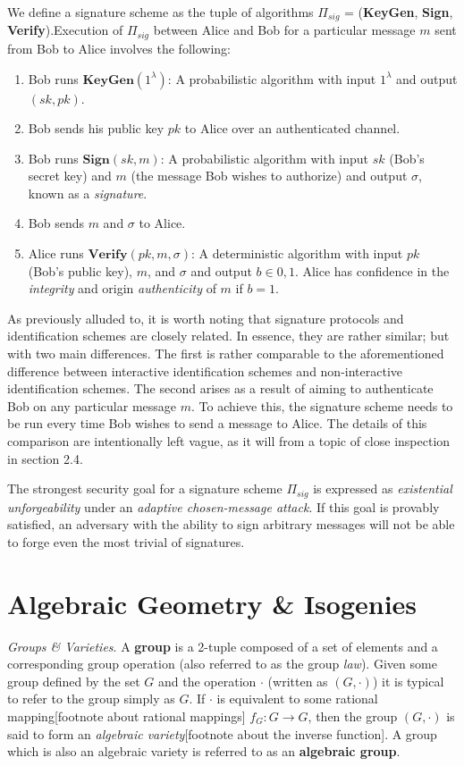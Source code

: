 We define a signature scheme as the tuple of algorithms $\Pi_{sig}$ = (\textbf{KeyGen}, \textbf{Sign}, \textbf{Verify}).Execution of $\Pi_{sig}$ between Alice and Bob for a particular message $m$ sent from Bob to Alice involves the following:
\begin{enumerate}[label=(\roman*)]
\item Bob runs $\textbf{KeyGen}(1^\lambda)$: A probabilistic algorithm with input $1^\lambda$ and output $(sk,pk)$.
\item Bob sends his public key $pk$ to Alice over an authenticated channel.
\item Bob runs $\textbf{Sign}(sk, m)$: A probabilistic algorithm with input $sk$ (Bob's secret key) and $m$ (the message Bob wishes to authorize) and output $\sigma$, known as a \emph{signature}.
\item Bob sends $m$ and $\sigma$ to Alice.
\item Alice runs $\textbf{Verify}(pk, m, \sigma)$: A deterministic algorithm with input $pk$ (Bob's public key), $m$, and $\sigma$ and output $b \in {0,1}$. Alice has confidence in the \emph{integrity} and origin \emph{authenticity} of $m$ if $b = 1$.
\end{enumerate}

As previously alluded to, it is worth noting that signature protocols and identification schemes are closely related. In essence, they are rather similar; but with two main differences. The first is rather comparable to the aforementioned difference between interactive identification schemes and non-interactive identification schemes. The second arises as a result of aiming to authenticate Bob on any particular message $m$. To achieve this, the signature scheme needs to be run every time Bob wishes to send a message to Alice. The details of this comparison are intentionally left vague, as it will from a topic of close inspection in section 2.4.

The strongest security goal for a signature scheme $\Pi_{sig}$ is expressed as \emph{existential unforgeability} under an \emph{adaptive chosen-message attack}. If this goal is provably satisfied, an adversary with the ability to sign arbitrary messages will not be able to forge even the most trivial of signatures.

\section{Algebraic Geometry \& Isogenies}
\emph{Groups \& Varieties}. A \textbf{group} is a 2-tuple composed of a set of elements and a corresponding group operation (also referred to as the group \emph{law}). Given some group defined by the set $G$ and the operation $\cdot$ (written as $(G,\cdot)$) it is typical to refer to the group simply as $G$. If $\cdot$ is equivalent to some rational mapping[footnote about rational mappings] $f_G: G \rightarrow G$, then the group $(G,\cdot)$ is said to form an \textit{algebraic variety}[footnote about the inverse function]. A group which is also an algebraic variety is referred to as an \textbf{algebraic group}.

